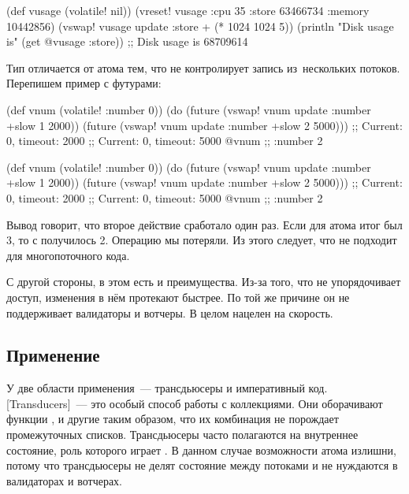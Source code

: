 \else

\begin{clojure}
(def vusage (volatile! nil))
(vreset! vusage
         {:cpu 35
          :store 63466734
          :memory 10442856})
(vswap! vusage update :store + (* 1024 1024 5))
(println "Disk usage is" (get @vusage :store))
;; Disk usage is 68709614
\end{clojure}

\fi

Тип  отличается от атома тем, что не контролирует запись
из~нескольких потоков. Перепишем пример с футурами:

\ifnarrow

\begin{clojure}
(def vnum (volatile! {:number 0}))
(do (future (vswap! vnum update
              :number +slow 1 2000))
    (future (vswap! vnum update
              :number +slow 2 5000)))
;; Current: 0, timeout: 2000
;; Current: 0, timeout: 5000
@vnum ;; {:number 2}
\end{clojure}

\else

\begin{clojure}
(def vnum (volatile! {:number 0}))
(do (future (vswap! vnum update :number +slow 1 2000))
    (future (vswap! vnum update :number +slow 2 5000)))
;; Current: 0, timeout: 2000
;; Current: 0, timeout: 5000
@vnum ;; {:number 2}
\end{clojure}

\fi


Вывод говорит, что второе действие сработало один раз. Если для атома итог был
3, то с  получилось 2. Операцию  мы потеряли. Из
этого следует, что  не подходит для многопоточного кода.

С другой стороны, в этом есть и преимущества. Из-за того, что  не
упорядочивает доступ, изменения в нём протекают быстрее. По той же причине он не
поддерживает валидаторы и вотчеры. В целом  нацелен на скорость.

\subsection{Применение}

У  две области применения~--- трансдьюсеры и императивный
код. [Trans\-ducers]~---
это особый способ работы с коллекциями. Они оборачивают функции ,
 и другие таким образом, что их комбинация не порождает
промежуточных списков. Трансдьюсеры часто полагаются на внутреннее состояние,
роль которого играет . В данном случае возможности атома
излишни, потому что трансдьюсеры не делят состояние между потоками и не
нуждаются в валидаторах и вотчерах.

